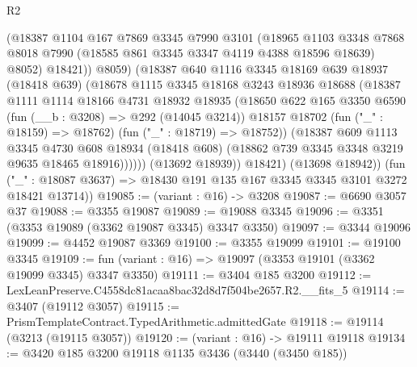 \begin{lexlean}{R2}
\begin{coremodule}
                  (@18387
                    @1104
                    @167
                    @7869
                    @3345
                    @7990
                    @3101
                    (@18965
                      @1103
                      @3348
                      @7868
                      @8018
                      @7990
                      (@18585 @861 @3345 @3347 @4119 @4388 @18596 @18639)
                      @8052)
                    @18421))
                @8059)
              (@18387
                @640
                @1116
                @3345
                @18169
                @639
                @18937
                (@18418 @639)
                (@18678
                  @1115
                  @3345
                  @18168
                  @3243
                  @18936
                  @18688
                  (@18387
                    @1111
                    @1114
                    @18166
                    @4731
                    @18932
                    @18935
                    (@18650
                      @622
                      @165
                      @3350
                      @6590
                      (fun (__b : @3208) => @292 (@14045 @3214))
                      @18157
                      @18702
                      (fun ("_" : @18159) => @18762)
                      (fun ("_" : @18719) => @18752))
                    (@18387
                      @609
                      @1113
                      @3345
                      @4730
                      @608
                      @18934
                      (@18418 @608)
                      (@18862 @739 @3345 @3348 @3219 @9635 @18465 @18916))))))
            (@13692 @18939))
          @18421)
        (@13698 @18942))
      (fun ("_" : @18087 @3637) => @18430 @191 @135 @167 @3345 @3345 @3101 @3272 @18421 @13714))
@19085 := (variant : @16) -> @3208
@19087 := @6690 @3057 @37
@19088 := @3355 @19087
@19089 := @19088 @3345
@19096 := @3351 (@3353 @19089 (@3362 @19087 @3345) @3347 @3350)
@19097 := @3344 @19096
@19099 := @4452 @19087 @3369
@19100 := @3355 @19099
@19101 := @19100 @3345
@19109 := fun (variant : @16) => @19097 (@3353 @19101 (@3362 @19099 @3345) @3347 @3350)
@19111 := @3404 @185 @3200
@19112 := LexLeanPreserve.C4558dc81acaa8bac32d8d7f504be2657.R2.__fits_5
@19114 := @3407 (@19112 @3057)
@19115 := PrismTemplateContract.TypedArithmetic.admittedGate
@19118 := @19114 (@3213 (@19115 @3057))
@19120 := (variant : @16) -> @19111 @19118
@19134 := @3420
    @185
    @3200
    @19118
    @1135
    @3436
    (@3440 (@3450 @185))

\end{coremodule}
\end{lexlean}
